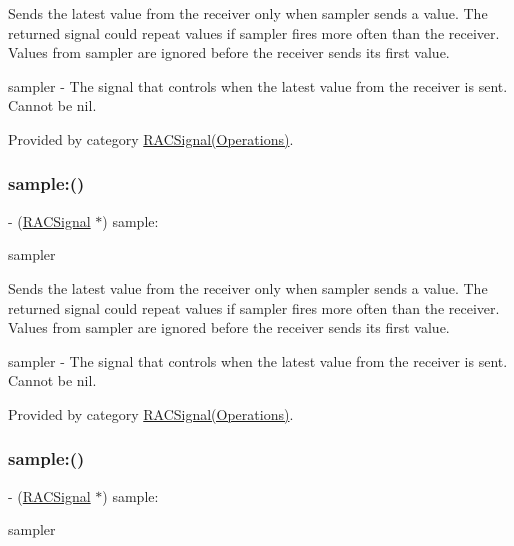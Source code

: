 Sends the latest value from the receiver only when {\ttfamily sampler} sends a value. The returned signal could repeat values if {\ttfamily sampler} fires more often than the receiver. Values from {\ttfamily sampler} are ignored before the receiver sends its first value.

sampler -\/ The signal that controls when the latest value from the receiver is sent. Cannot be nil. 

Provided by category \mbox{\hyperlink{category_r_a_c_signal_07_operations_08_a556702f113ba65f01fabf8363bd25e46}{R\+A\+C\+Signal(\+Operations)}}.

\mbox{\label{interface_r_a_c_signal_a556702f113ba65f01fabf8363bd25e46}} 
\subsubsection{\texorpdfstring{sample\+:()}{sample:()}\hspace{0.1cm}{\footnotesize\ttfamily [2/3]}}
{\footnotesize\ttfamily -\/ (\mbox{\hyperlink{interface_r_a_c_signal}{R\+A\+C\+Signal}} $\ast$) sample\+: \begin{DoxyParamCaption}\item[{(\mbox{\hyperlink{interface_r_a_c_signal}{R\+A\+C\+Signal}} $\ast$)}]{sampler }\end{DoxyParamCaption}}

Sends the latest value from the receiver only when {\ttfamily sampler} sends a value. The returned signal could repeat values if {\ttfamily sampler} fires more often than the receiver. Values from {\ttfamily sampler} are ignored before the receiver sends its first value.

sampler -\/ The signal that controls when the latest value from the receiver is sent. Cannot be nil. 

Provided by category \mbox{\hyperlink{category_r_a_c_signal_07_operations_08_a556702f113ba65f01fabf8363bd25e46}{R\+A\+C\+Signal(\+Operations)}}.

\mbox{\label{interface_r_a_c_signal_a556702f113ba65f01fabf8363bd25e46}} 
\subsubsection{\texorpdfstring{sample\+:()}{sample:()}\hspace{0.1cm}{\footnotesize\ttfamily [3/3]}}
{\footnotesize\ttfamily -\/ (\mbox{\hyperlink{interface_r_a_c_signal}{R\+A\+C\+Signal}} $\ast$) sample\+: \begin{DoxyParamCaption}\item[{(\mbox{\hyperlink{interface_r_a_c_signal}{R\+A\+C\+Signal}} $\ast$)}]{sampler }\end{DoxyParamCaption}}

